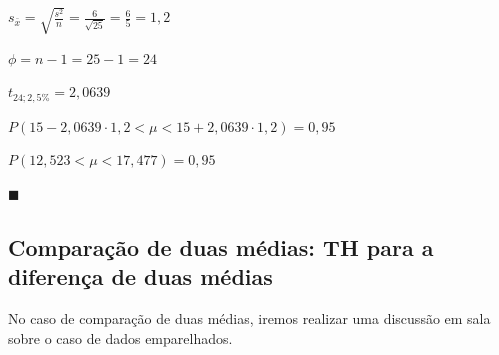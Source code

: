 \documentclass[oneside,a4paper,12pt]{article}
\begin{document}
$s_{\bar{x}}=\displaystyle \sqrt{\frac{s^2}{n}} = \frac{6}{\sqrt{25}} = \frac{6}{5} = 1,2$

$\phi = n - 1 = 25 - 1 = 24$

$t_{24;2,5\%} = 2,0639$

$P(15 - 2,0639 \cdot 1,2 < \mu < 15 + 2,0639 \cdot 1,2) = 0,95$

$P(12,523 < \mu < 17,477) = 0,95$

\begin{flushright}
	$\blacksquare$
\end{flushright}




\subsection{Comparação de duas médias: TH para a diferença de duas médias}

No caso de comparação de duas médias, iremos realizar uma discussão em sala sobre o caso de dados emparelhados.

\end{document}

